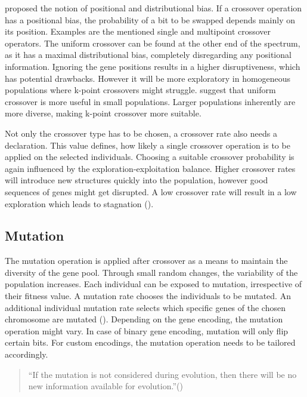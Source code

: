 \cite{srinivas_genetic_1994} proposed the notion of positional and distributional bias. If a crossover operation has a positional bias, the probability of a bit to be swapped depends mainly on its position. Examples are the mentioned single and multipoint crossover operators. The uniform crossover can be found at the other end of the spectrum, as it has a maximal distributional bias, completely disregarding any positional information. Ignoring the gene positions results in a higher disruptiveness, which has potential drawbacks. However it will be more exploratory in homogeneous populations where k-point crossovers might struggle. \cite{srinivas_genetic_1994} suggest that uniform crossover is more useful in small populations. Larger populations inherently are more diverse, making k-point crossover more suitable.

Not only the crossover type has to be chosen, a crossover rate also needs a declaration. This value defines, how likely a single crossover operation is to be applied on the selected individuals.
Choosing a suitable crossover probability is again influenced by the exploration-exploitation balance. Higher crossover rates will introduce new structures quickly into the population, however good sequences of genes might get disrupted. A low crossover rate will result in a low exploration which leads to stagnation (\cite{grefenstette_optimization_1986}).

\subsection{Mutation}
The mutation operation is applied after crossover as a means to maintain the diversity of the gene pool. Through small random changes, the variability of the population increases. Each individual can be exposed to mutation, irrespective of their fitness value.
A mutation rate chooses the individuals to be mutated. An additional individual mutation rate selects which specific genes of the chosen chromosome are mutated (\cite{srinivas_genetic_1994}). Depending on the gene encoding, the mutation operation might vary. In case of binary gene encoding, mutation will only flip certain bits. For custom encodings, the mutation operation needs to be tailored accordingly.

\begin{quote}
	\begin{em}
		\enquote{If the mutation is not considered during evolution, then there will be no new information available for evolution.}(\cite{katoch_review_2021})
	\end{em}
\end{quote}

